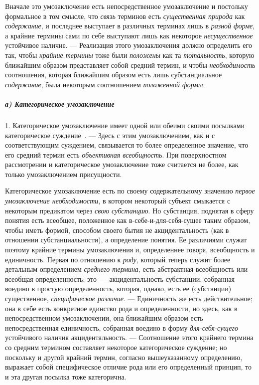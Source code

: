 \documentclass[twoside]{article}
\begin{document}
{{{{{{Вначале это умозаключение есть непосредственное умозаключение
и постольку формальное в том смысле, что
{\em связь} терминов есть
{\em существенная природа}
как {\em содержание},
и последнее выступает в различных терминах лишь в
{\em разной форме}, а
крайние термины сами по себе выступают лишь как некоторое
{\em несущественное}
устойчивое наличие. — Реализация этого
умозаключения должно определить его так, чтобы
{\em крайние термины
}тоже были
{\em положены} как та
{\em тотальность},
которую ближайшим образом представляет собой средний термин,
и чтобы {\em необходимость}
соотношения, которая ближайшим образом есть лишь
субстанциальное {\em содержание},
была некоторым соотношением
{\em положенной формы}.

\subparagraph[а) Категорическое умозаключение]{а) Категорическое умозаключение}
1. Категорическое умозаключение имеет одной или обеими своими
посылками категорическое
суждение~\label{bkm:bm59}.
— Здесь с этим умозаключением, как и с соответствующим
суждением, связывается то более определенное значение, что
его средний термин есть {\em объективная
всеобщность}. При поверхностном рассмотрении и
категорическое умозаключение тоже считается не более, как только
умозаключением присущности.

Категорическое умозаключение есть по своему содержательному
значению {\em первое умозаключение
необходимости}, в котором некоторый субъект смыкается с
некоторым предикатом через {\em свою
субстанцию}. Но субстанция, поднятая в сферу понятия есть
всеобщее, положенное как в-себе-и-для-себя-сущее таким образом, чтобы иметь
формой, способом своего бытия не акцидентальность (как в отношении
субстанциальности), а определение понятия. Ее различиями служат поэтому
крайние термины умозаключения и, определеннее говоря, всеобщность и
единичность. Первая по отношению к
{\em роду}, который
теперь служит более детальным определением
{\em среднего термина},
есть абстрактная всеобщность или всеобщая определенность:
это —~акцидентальность субстанции, собранная воедино в
простую определенность, которая, однако, есть ее (субстанции) существенное,
{\em специфическое различие}. —
Единичность же есть действительное; она в себе есть
конкретное единство рода и определенности, но здесь, как в непосредственном
умозаключении, она ближайшим образом есть непосредственная единичность,
собранная воедино в форму
{\em для-себя-сущего}
устойчивого наличия акцидентальность. —
Соотношение этого крайнего термина со средним термином
составляет некоторое категорическое суждение; но поскольку и другой крайний
термин, согласно вышеуказанному определению, выражает собой специфическое
отличие рода или его определенный принцип, то и эта другая посылка тоже
категорична.

}}}}}}
\end{document}
